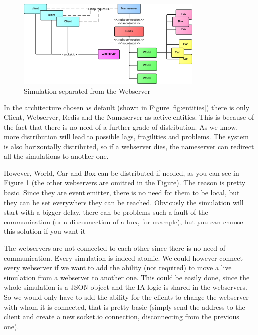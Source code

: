 \begin{figure}[H]
\centering %
\includegraphics[width=0.8\textwidth]{./img/SystemAnalysis/EntitiesWebserver4everAlone.png}
\caption{Simulation separated from the Webserver}
\label{fig:entitiesWebserver4everAlone}
\end{figure}

In the architecture chosen as default (shown in Figure \ref{fig:entities}) there is only Client, Webserver, Redis and the Nameserver as active entities. This is because of the fact that there is no need of a further grade of distribution. As we know, more distribution will lead to possible lags, fragilities and problems. The system is also horizontally distributed, so if a webserver dies, the nameserver can redirect all the simulations to another one.

However, World, Car and Box can be distributed if needed, as you can see in Figure \ref{fig:entitiesWebserver4everAlone} (the other webservers are omitted in the Figure). The reason is pretty basic. Since they are event emitter, there is no need for them to be local, but they can be set everywhere they can be reached. Obviously the simulation will start with a bigger delay, there can be problems such a fault of the communication (or a disconnection of a box, for example), but you can choose this solution if you want it.

The webservers are not connected to each other since there is no need of communication. Every simulation is indeed atomic. We could however connect every webserver if we want to add the ability (not required) to move a live simulation from a webserver to another one. This could be easily done, since the whole simulation is a JSON object and the IA logic is shared in the webservers. So we would only have to add the ability for the clients to change the webserver with whom it is connected, that is pretty basic (simply send the address to the client and create a new socket.io connection, disconnecting from the previous one).

